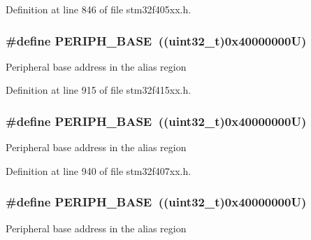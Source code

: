 Definition at line 846 of file stm32f405xx.\+h.

\subsubsection[{\texorpdfstring{P\+E\+R\+I\+P\+H\+\_\+\+B\+A\+SE}{PERIPH_BASE}}]{\setlength{\rightskip}{0pt plus 5cm}\#define P\+E\+R\+I\+P\+H\+\_\+\+B\+A\+SE~((uint32\+\_\+t)0x40000000\+U)}\hypertarget{group___peripheral__registers__structures_ga9171f49478fa86d932f89e78e73b88b0}{}\label{group___peripheral__registers__structures_ga9171f49478fa86d932f89e78e73b88b0}
Peripheral base address in the alias region 

Definition at line 915 of file stm32f415xx.\+h.

\subsubsection[{\texorpdfstring{P\+E\+R\+I\+P\+H\+\_\+\+B\+A\+SE}{PERIPH_BASE}}]{\setlength{\rightskip}{0pt plus 5cm}\#define P\+E\+R\+I\+P\+H\+\_\+\+B\+A\+SE~((uint32\+\_\+t)0x40000000\+U)}\hypertarget{group___peripheral__registers__structures_ga9171f49478fa86d932f89e78e73b88b0}{}\label{group___peripheral__registers__structures_ga9171f49478fa86d932f89e78e73b88b0}
Peripheral base address in the alias region 

Definition at line 940 of file stm32f407xx.\+h.

\subsubsection[{\texorpdfstring{P\+E\+R\+I\+P\+H\+\_\+\+B\+A\+SE}{PERIPH_BASE}}]{\setlength{\rightskip}{0pt plus 5cm}\#define P\+E\+R\+I\+P\+H\+\_\+\+B\+A\+SE~((uint32\+\_\+t)0x40000000\+U)}\hypertarget{group___peripheral__registers__structures_ga9171f49478fa86d932f89e78e73b88b0}{}\label{group___peripheral__registers__structures_ga9171f49478fa86d932f89e78e73b88b0}
Peripheral base address in the alias region 

